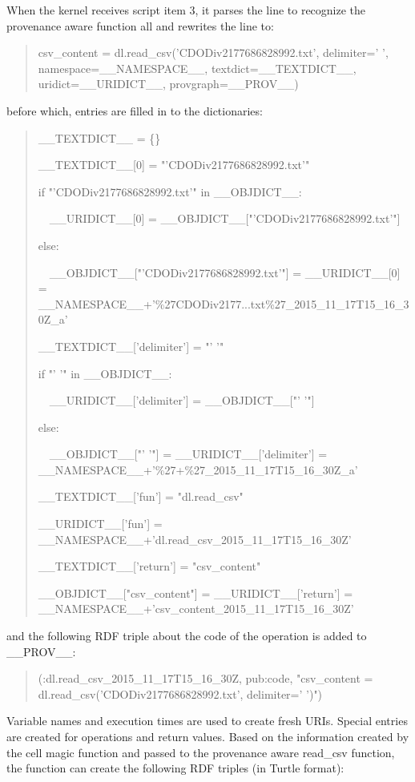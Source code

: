 When the kernel receives script item 3, it parses the line to recognize the provenance aware function all and rewrites the line to:
\begin{quotation}
	\noindent csv\_content = dl.read\_csv('CDODiv2177686828992.txt', delimiter=' ', namespace=\_\_NAMESPACE\_\_, textdict=\_\_TEXTDICT\_\_, uridict=\_\_URIDICT\_\_, provgraph=\_\_PROV\_\_)
\end{quotation}
before which, entries are filled in to the dictionaries:
\begin{quotation}
	\noindent \_\_TEXTDICT\_\_ = \{\}
	
	\noindent \_\_TEXTDICT\_\_[0] = "'CDODiv2177686828992.txt'"
	
	\noindent if "'CDODiv2177686828992.txt'" in \_\_OBJDICT\_\_:
	
	\noindent \ \ \_\_URIDICT\_\_[0] = \_\_OBJDICT\_\_["'CDODiv2177686828992.txt'"]
	
	\noindent else:
	
	\noindent \ \ \_\_OBJDICT\_\_["'CDODiv2177686828992.txt'"] = \_\_URIDICT\_\_[0] = \_\_NAMESPACE\_\_+'\%27CDODiv2177...txt\%27\_2015\_11\_17T15\_16\_30Z\_a'
	
	\noindent \_\_TEXTDICT\_\_['delimiter'] = "' '"
	
	\noindent if "' '" in \_\_OBJDICT\_\_:
	
	\noindent \ \ \_\_URIDICT\_\_['delimiter'] = \_\_OBJDICT\_\_["' '"]
	
	\noindent else:
	
	\noindent \ \ \_\_OBJDICT\_\_["' '"] = \_\_URIDICT\_\_['delimiter'] = \_\_NAMESPACE\_\_+'\%27+\%27\_2015\_11\_17T15\_16\_30Z\_a'
	
	\noindent \_\_TEXTDICT\_\_['fun'] = "dl.read\_csv"
	
	\noindent \_\_URIDICT\_\_['fun'] = \_\_NAMESPACE\_\_+'dl.read\_csv\_2015\_11\_17T15\_16\_30Z'
	
	\noindent \_\_TEXTDICT\_\_['return'] = "csv\_content"
	
	\noindent \_\_OBJDICT\_\_["csv\_content"] = \_\_URIDICT\_\_['return'] = \_\_NAMESPACE\_\_+'csv\_content\_2015\_11\_17T15\_16\_30Z'
\end{quotation}
and the following RDF triple about the code of the operation is added to \_\_PROV\_\_:
\begin{quotation}
	\noindent (:dl.read\_csv\_2015\_11\_17T15\_16\_30Z, pub:code, "csv\_content = dl.read\_csv('CDODiv2177686828992.txt', delimiter=' ')")
\end{quotation} 
Variable names and execution times are used to create fresh URIs. Special entries are created for operations and return values. Based on the information created by the cell magic function and passed to the provenance aware read\_csv function, the function can create the following RDF triples (in Turtle format):
